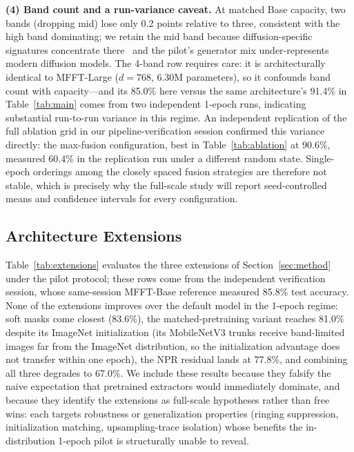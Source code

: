 \documentclass[journal]{IEEEtran}
\begin{document}
\textbf{(4) Band count and a run-variance caveat.} At matched Base capacity, two bands (dropping mid) lose only 0.2 points relative to three, consistent with the high band dominating; we retain the mid band because diffusion-specific signatures concentrate there~\cite{corvi2023} and the pilot's generator mix under-represents modern diffusion models. The 4-band row requires care: it is architecturally identical to MFFT-Large ($d{=}768$, 6.30M parameters), so it confounds band count with capacity---and its 85.0\% here versus the same architecture's 91.4\% in Table~\ref{tab:main} comes from two independent 1-epoch runs, indicating substantial run-to-run variance in this regime. An independent replication of the full ablation grid in our pipeline-verification session confirmed this variance directly: the max-fusion configuration, best in Table~\ref{tab:ablation} at 90.6\%, measured 60.4\% in the replication run under a different random state. Single-epoch orderings among the closely spaced fusion strategies are therefore not stable, which is precisely why the full-scale study will report seed-controlled means and confidence intervals for every configuration.

\subsection{Architecture Extensions}
\label{sec:extensions}
Table~\ref{tab:extensions} evaluates the three extensions of Section~\ref{sec:method} under the pilot protocol; these rows come from the independent verification session, whose same-session MFFT-Base reference measured 85.8\% test accuracy. None of the extensions improves over the default model in the 1-epoch regime: soft masks come closest (83.6\%), the matched-pretraining variant reaches 81.0\% despite its ImageNet initialization (its MobileNetV3 trunks receive band-limited images far from the ImageNet distribution, so the initialization advantage does not transfer within one epoch), the NPR residual lands at 77.8\%, and combining all three degrades to 67.0\%. We include these results because they falsify the naive expectation that pretrained extractors would immediately dominate, and because they identify the extensions as full-scale hypotheses rather than free wins: each targets robustness or generalization properties (ringing suppression, initialization matching, upsampling-trace isolation) whose benefits the in-distribution 1-epoch pilot is structurally unable to reveal.
\end{document}
